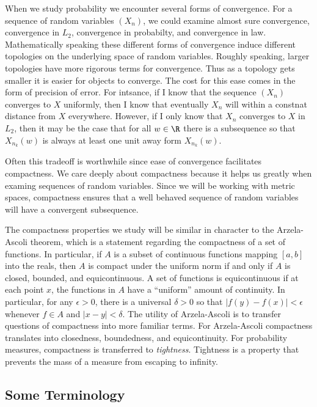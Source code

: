 \documentclass{report}
\begin{document}
When we study probability we encounter several forms of convergence. 
For a sequence of random variables $(X_n)$, we could examine almost
sure convergence, convergence in $L_2$, convergence in probabilty, and
convergence in law.  Mathematically speaking these different forms of
convergence induce different topologies on the underlying space of
random variables.  Roughly speaking, larger topologies have more
rigorous terms for convergence.  Thus as a topology gets smaller it is
easier for objects to converge.  The cost for this ease comes in the
form of precision of error.  For intsance, if I know that the sequence
$(X_n)$ converges to $X$ uniformly, then I know that eventually $X_n$
will within a constnat distance from $X$ everywhere.  However, if I
only know that $X_n$ converges to $X$ in $L_2$, then it may be the
case that for all $w \in \R$ there is a subsequence so that
$X_{n_k}(w)$ is always at least one unit away form $X_{n_k}(w)$.

Often this tradeoff is worthwhile since ease of convergence
facilitates compactness.  We care deeply about compactness because it
helps us greatly when examing sequences of random variables.  Since we
will be working with metric spaces, compactness ensures that a well
behaved sequence of random variables will have a convergent
subsequence.

The compactness properties we study will be similar in character to
the Arzela-Ascoli theorem, which is a statement regarding the
compactness of a set of functions.  In particular, if $A$ is a subset
of continuous functions mapping $[a,b]$ into the reals, then $A$ is
compact under the uniform norm if and only if $A$ is closed, bounded,
and equicontinuous.  A set of functions is equicontinuous if at each
point $x$, the functions in $A$ have a ``uniform'' amount of
continuity.  In particular, for any $\epsilon > 0$, there is a
universal $\delta>0$ so that $|f(y)-f(x)|<\epsilon$ whenever $f \in A$
and $|x-y|<\delta$.  The utility of Arzela-Ascoli is to transfer
questions of compactness into more familiar terms.  For Arzela-Ascoli
compactness translates into closedness, boundedness, and
equicontinuity.  For probability measures, compactness is transferred
to \emph{tightness}.  Tightness is a property that prevents the mass
of a measure from escaping to infinity.

\subsection{Some Terminology}
\end{document}
